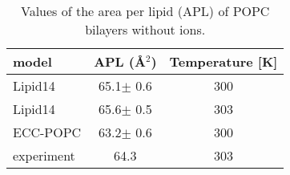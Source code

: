  
\begin{table}[tb!] 
  \caption{Values of the area per lipid (APL) of POPC bilayers without ions. \label{tab:apls} 
  } 
  \begin{tabular}{l|c c} 
    model          & APL (Å$^2$)   & Temperature [K] \\ 
    \hline 
    Lipid14                   & 65.1$\pm$ 0.6  &  300 \\ 
    Lipid14 \citep{dickson14}  & 65.6$\pm$ 0.5  &  303 \\ 
    \hline 
    ECC-POPC                & 63.2$\pm$ 0.6  &  300       \\ 
    \hline 
    experiment \citep{kucerka11} & 64.3  &  303    \\ 
    \hline 
  \end{tabular} 
\end{table} 
 
